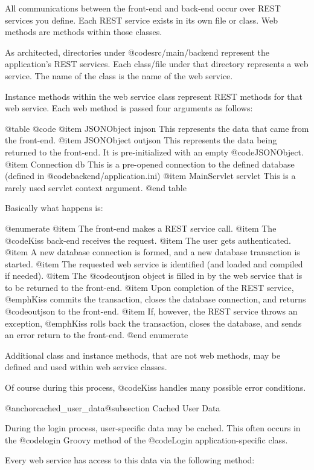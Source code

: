 All communications between the front-end and back-end occur over REST
services you define.  Each REST service exists in its own
file or class.  Web methods are methods within those classes.

As architected, directories under @code{src/main/backend}
represent the application's REST services.  Each class/file under that
directory represents a web service.  The name of the class is the name
of the web service.

Instance methods within the web service class represent REST methods
for that web service.  Each web method is passed four arguments as follows:

@table @code
@item JSONObject injson
This represents the data that came from the front-end.
@item JSONObject outjson
This represents the data being returned to the front-end.  It is pre-initialized with an empty @code{JSONObject}.
@item Connection db
This is a pre-opened connection to the defined database (defined in @code{backend/application.ini})
@item MainServlet servlet
This is a rarely used servlet context argument.
@end table

Basically what happens is:

@enumerate
@item
The front-end makes a REST service call.
@item
The @code{Kiss} back-end receives the request.
@item
The user gets authenticated.
@item
A new database connection is formed, and a new database transaction is started.
@item
The requested web service is identified (and loaded and compiled if needed).
@item
The @code{outjson} object is filled in by the web service that is to be returned to the front-end.
@item
Upon completion of the REST service, @emph{Kiss} commits the transaction, closes the database connection, and returns @code{outjson} to the front-end.
@item
If, however, the REST service throws an exception, @emph{Kiss} rolls back the transaction, closes the database, and sends an error return to the front-end.
@end enumerate

Additional class and instance methods, that are not web methods, may
be defined and used within web service classes.

Of course during this process, @code{Kiss} handles many possible error conditions.

@anchor{cached_user_data}@subsection Cached User Data

During the login process, user-specific data may be cached.  This
often occurs in the @code{login} Groovy method of the @code{Login}
application-specific class.

Every web service has access to this data via the following method:

